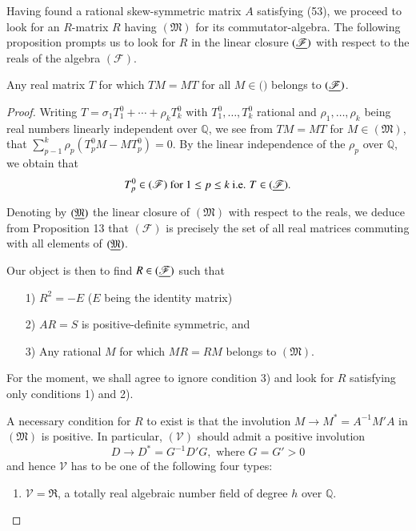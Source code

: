 Having found a rational skew-symmetric matrix $A$ satisfying (53), we
proceed to look for an $R$-matrix $R$ having $(\mathfrak{M})$ for its
commutator-algebra. The following proposition prompts us to look for
$R$ in the linear closure $(\underline{\mathscr{F}})$ with respect to the
reals of the algebra $(\mathscr{F})$.

\begin{proposition}
Any real matrix $T$ for which $TM=MT$ for all $M \in (\mathfrak)$
belongs to $(\underline{\mathscr{F}})$. 
\end{proposition}

\begin{proof}
Writing $T = \sigma_1 T^0_1 + \cdots + \rho_k T^0_k$ with
$T^0_1,\ldots, T^0_k$ rational and $\rho_1,\ldots, \rho_k$ being real
numbers linearly independent over $\mathbb{Q}$, we see from $TM=MT$
for $M \in (\mathfrak{M})$, that $\sum\limits^k_{p-1}\rho_p(T^0_p M -
M T^0_p)=0$. By the linear independence of the $\rho_p$ over
$\mathbb{Q}$, we obtain that
$$
T^0_p \in (\mathscr{F}) \text{ for } 1 \leq p \leq k \text{ i.e. } T
\in (\underline{\mathscr{F}}).
$$

Denoting by $(\underline{\mathfrak{M}})$ the linear closure of
$(\mathfrak{M})$ with respect to the reals, we deduce from Proposition
13 that $(\mathscr{F})$ is precisely the set of all real matrices
commuting with all elements of $(\underline{\mathfrak{M}})$.

Our object is then to find $R \in (\underline{\mathscr{F}})$ such that
\begin{itemize}
\item[{\rm 1)}] $R^2 = - E$ ($E$ being the identity matrix)

\item[{\rm 2)}] $AR = S$ is positive-definite symmetric, and

\item[{\rm 3)}] Any \pageoriginale rational $M$ for which $MR=RM$
  belongs to $(\mathfrak{M})$. 
\end{itemize}
For the moment, we shall agree to ignore condition 3) and look for $R$
satisfying only conditions 1) and 2). 

A necessary condition for $R$ to exist is that the involution $M
\rightarrow M^{\ast} = A^{-1}M' A$ in $(\mathfrak{M})$ is positive. In
particular, $(\mathscr{V})$ should admit a positive involution
\begin{equation*}
D \rightarrow D^{\ast} = G^{-1}D'G, \text{ where } G = G'>0 \tag{55}\label{eq55}
\end{equation*}
and hence $\mathscr{V}$ has to be one of the following four types:
\begin{enumerate}
\renewcommand{\theenumi}{\roman{enumi}}
\renewcommand{\labelenumi}{\theenumi)}
\item $\mathscr{V} = \mathfrak{R}$, a totally real algebraic number
  field of degree $h$ over $\mathbb{Q}$.


\end{enumerate}
\end{proof}
